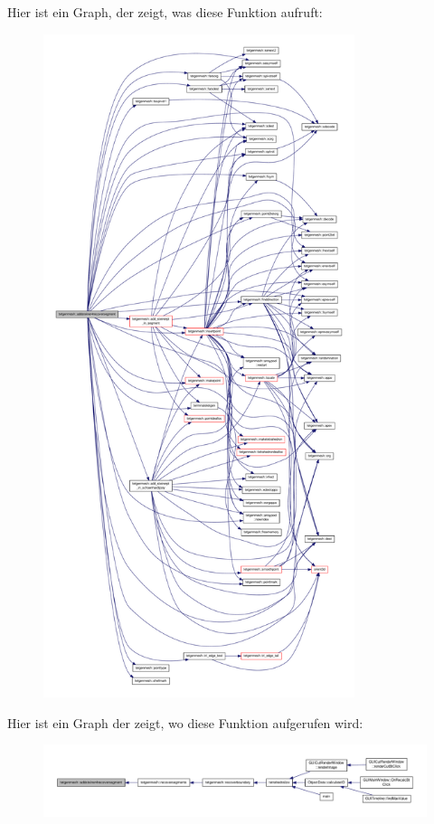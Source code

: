Hier ist ein Graph, der zeigt, was diese Funktion aufruft\-:
\nopagebreak
\begin{figure}[H]
\begin{center}
\leavevmode
\includegraphics[height=550pt]{classtetgenmesh_a9d878a0e64588b0471a58e534affea8e_cgraph}
\end{center}
\end{figure}




Hier ist ein Graph der zeigt, wo diese Funktion aufgerufen wird\-:
\nopagebreak
\begin{figure}[H]
\begin{center}
\leavevmode
\includegraphics[width=350pt]{classtetgenmesh_a9d878a0e64588b0471a58e534affea8e_icgraph}
\end{center}
\end{figure}


